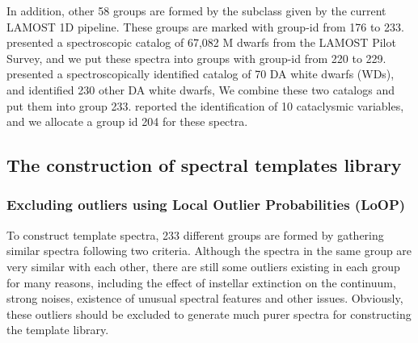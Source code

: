 \documentclass[manuscript]{aastex}
\begin{document}

In addition, other 58 groups are formed by the subclass given by the current LAMOST 1D pipeline.
These groups are marked with group-id from 176 to 233.
  \citet{yi2013m} presented a spectroscopic catalog of 67,082 M dwarfs from the LAMOST Pilot Survey,
and we put these spectra into groups with group-id from 220 to 229.
  \citet{zhao201370}  presented a spectroscopically identified catalog of 70 DA white dwarfs  (WDs),
  and \citet{zhang2013white}  identified 230 other DA  white dwarfs,
We combine these two catalogs and put them into group 233.
  \citet{jiang2013data} reported the identification of 10 cataclysmic variables,
and we allocate a group id 204 for these spectra.
%









\subsection{The construction of spectral templates library}
\subsubsection{Excluding outliers using Local Outlier Probabilities (LoOP)}
To construct template spectra,
233 different groups are formed by gathering similar spectra following two criteria.
Although the spectra  in the same group are very similar with each other, there are still some outliers existing in each group for many reasons,
including the effect of instellar extinction on the continuum, strong noises, existence of unusual spectral features and other issues.
Obviously, these outliers should be excluded to generate much purer spectra for  constructing the template library.
\end{document}
